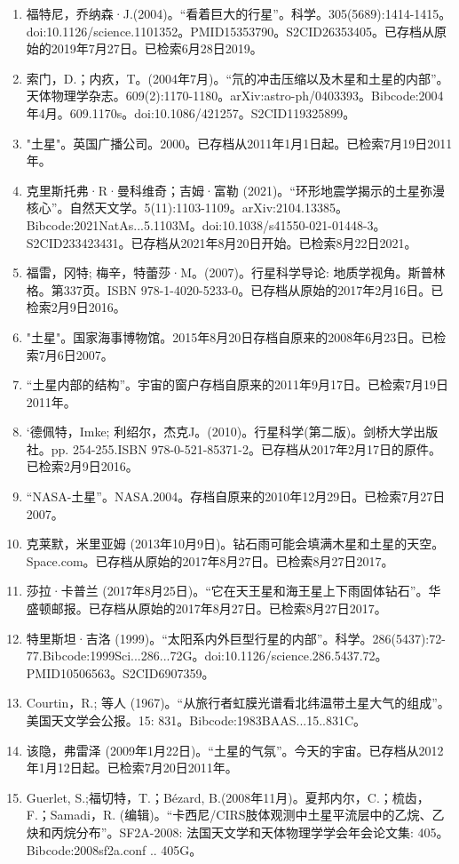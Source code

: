 \begin{enumerate}
\item 福特尼，乔纳森·J.(2004)。“看着巨大的行星”。科学。305(5689):1414-1415。doi:10.1126/science.1101352。PMID15353790。S2CID26353405。已存档从原始的2019年7月27日。已检索6月28日2019。  
\item 索门，D.；内疚，T。(2004年7月)。“氘的冲击压缩以及木星和土星的内部”。天体物理学杂志。609(2):1170-1180。arXiv:astro-ph/0403393。Bibcode:2004年4月。609.1170s。doi:10.1086/421257。S2CID119325899。 
\item "土星"。英国广播公司。2000。已存档从2011年1月1日起。已检索7月19日2011年。
\item 克里斯托弗·R·曼科维奇；吉姆·富勒 (2021)。“环形地震学揭示的土星弥漫核心”。自然天文学。5(11):1103-1109。arXiv:2104.13385。Bibcode:2021NatAs...5.1103M。doi:10.1038/s41550-021-01448-3。S2CID233423431。已存档从2021年8月20日开始。已检索8月22日2021。 
\item 福雷，冈特; 梅辛，特蕾莎·M。(2007)。行星科学导论: 地质学视角。斯普林格。第337页。ISBN 978-1-4020-5233-0。已存档从原始的2017年2月16日。已检索2月9日2016。
\item "土星"。国家海事博物馆。2015年8月20日存档自原来的2008年6月23日。已检索7月6日2007。
\item “土星内部的结构”。宇宙的窗户存档自原来的2011年9月17日。已检索7月19日2011年。
\item `德佩特，Imke; 利绍尔，杰克J。(2010)。行星科学(第二版)。剑桥大学出版社。pp. 254-255.ISBN 978-0-521-85371-2。已存档从2017年2月17日的原件。已检索2月9日2016。
\item “NASA-土星”。NASA.2004。存档自原来的2010年12月29日。已检索7月27日2007。
\item 克莱默，米里亚姆 (2013年10月9日)。钻石雨可能会填满木星和土星的天空。Space.com。已存档从原始的2017年8月27日。已检索8月27日2017。
\item 莎拉·卡普兰 (2017年8月25日)。“它在天王星和海王星上下雨固体钻石”。华盛顿邮报。已存档从原始的2017年8月27日。已检索8月27日2017。
\item 特里斯坦·吉洛 (1999)。“太阳系内外巨型行星的内部”。科学。286(5437):72-77.Bibcode:1999Sci...286...72G。doi:10.1126/science.286.5437.72。PMID10506563。S2CID6907359。  
\item Courtin，R.; 等人 (1967)。“从旅行者虹膜光谱看北纬温带土星大气的组成”。美国天文学会公报。15: 831。Bibcode:1983BAAS...15..831C。
\item 该隐，弗雷泽 (2009年1月22日)。“土星的气氛”。今天的宇宙。已存档从2012年1月12日起。已检索7月20日2011年。
\item Guerlet, S.;福切特，T.；Bézard, B.(2008年11月)。夏邦内尔，C.；梳齿，F.；Samadi，R. (编辑)。“卡西尼/CIRS肢体观测中土星平流层中的乙烷、乙炔和丙烷分布”。SF2A-2008: 法国天文学和天体物理学学会年会论文集: 405。Bibcode:2008sf2a.conf .. 405G。

\end{enumerate}
